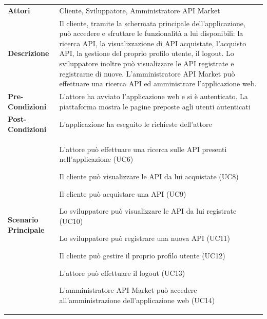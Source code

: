 \begin{longtable}{ l | p{11cm}}
	\hline
	\rowcolor{Gray}
	 \multicolumn{2}{c}{UC2 - Main post-autenticazione} \\
	 \hline
	\textbf{Attori} & Cliente, Sviluppatore, Amministratore API Market \\
	\textbf{Descrizione} & Il cliente, tramite la schermata principale dell'applicazione, può accedere e sfruttare le funzionalità a lui disponibili: la ricerca API, la visualizzazione di API acquistate, l'acquisto API, la gestione del proprio profilo utente, il logout.
	Lo sviluppatore inoltre può visualizzare le API registrate e registrarne di nuove.
	L'amministratore API Market può effettuare una ricerca API ed amministrare l'applicazione web. \\
	\textbf{Pre-Condizioni} & L'attore ha avviato l'applicazione web e si è autenticato. La piattaforma mostra le pagine preposte agli utenti autenticati \\
	\textbf{Post-Condizioni} & L'applicazione ha eseguito le richieste dell'attore \\
	\textbf{Scenario Principale} & 
	\begin{enumerate*}[label=(\arabic*.),itemjoin={\newline}]
		\item L'attore può effettuare una ricerca sulle API presenti nell'applicazione
(UC6)
		\item Il cliente può visualizzare le API da lui acquistate (UC8)
		\item Il cliente può acquistare una API (UC9)
		\item Lo sviluppatore può visualizzare le API da lui registrate (UC10)
		\item Lo sviluppatore può registrare una nuova API (UC11)
		\item Il cliente può gestire il proprio profilo utente (UC12)
		\item L'attore può effettuare il logout (UC13)
		\item L'amministratore API Market può accedere all'amministrazione dell'applicazione web (UC14)
	\end{enumerate*}\\
\end{longtable}